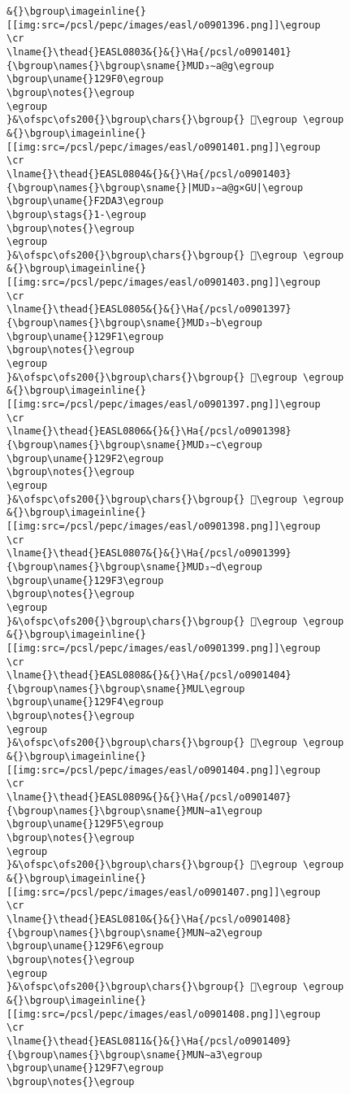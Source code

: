 \begin{verbatim}
&{}\bgroup\imageinline{}[[img:src=/pcsl/pepc/images/easl/o0901396.png]]\egroup
\cr
\lname{}\thead{}EASL0803&{}&{}\Ha{/pcsl/o0901401}{\bgroup\names{}\bgroup\sname{}MUD₃∼a@g\egroup
\bgroup\uname{}129F0\egroup
\bgroup\notes{}\egroup
\egroup
}&\ofspc\ofs200{}\bgroup\chars{}\bgroup{} 𒧰\egroup \egroup
&{}\bgroup\imageinline{}[[img:src=/pcsl/pepc/images/easl/o0901401.png]]\egroup
\cr
\lname{}\thead{}EASL0804&{}&{}\Ha{/pcsl/o0901403}{\bgroup\names{}\bgroup\sname{}|MUD₃∼a@g×GU|\egroup
\bgroup\uname{}F2DA3\egroup
\bgroup\stags{}1-\egroup
\bgroup\notes{}\egroup
\egroup
}&\ofspc\ofs200{}\bgroup\chars{}\bgroup{} 󲶣\egroup \egroup
&{}\bgroup\imageinline{}[[img:src=/pcsl/pepc/images/easl/o0901403.png]]\egroup
\cr
\lname{}\thead{}EASL0805&{}&{}\Ha{/pcsl/o0901397}{\bgroup\names{}\bgroup\sname{}MUD₃∼b\egroup
\bgroup\uname{}129F1\egroup
\bgroup\notes{}\egroup
\egroup
}&\ofspc\ofs200{}\bgroup\chars{}\bgroup{} 𒧱\egroup \egroup
&{}\bgroup\imageinline{}[[img:src=/pcsl/pepc/images/easl/o0901397.png]]\egroup
\cr
\lname{}\thead{}EASL0806&{}&{}\Ha{/pcsl/o0901398}{\bgroup\names{}\bgroup\sname{}MUD₃∼c\egroup
\bgroup\uname{}129F2\egroup
\bgroup\notes{}\egroup
\egroup
}&\ofspc\ofs200{}\bgroup\chars{}\bgroup{} 𒧲\egroup \egroup
&{}\bgroup\imageinline{}[[img:src=/pcsl/pepc/images/easl/o0901398.png]]\egroup
\cr
\lname{}\thead{}EASL0807&{}&{}\Ha{/pcsl/o0901399}{\bgroup\names{}\bgroup\sname{}MUD₃∼d\egroup
\bgroup\uname{}129F3\egroup
\bgroup\notes{}\egroup
\egroup
}&\ofspc\ofs200{}\bgroup\chars{}\bgroup{} 𒧳\egroup \egroup
&{}\bgroup\imageinline{}[[img:src=/pcsl/pepc/images/easl/o0901399.png]]\egroup
\cr
\lname{}\thead{}EASL0808&{}&{}\Ha{/pcsl/o0901404}{\bgroup\names{}\bgroup\sname{}MUL\egroup
\bgroup\uname{}129F4\egroup
\bgroup\notes{}\egroup
\egroup
}&\ofspc\ofs200{}\bgroup\chars{}\bgroup{} 𒧴\egroup \egroup
&{}\bgroup\imageinline{}[[img:src=/pcsl/pepc/images/easl/o0901404.png]]\egroup
\cr
\lname{}\thead{}EASL0809&{}&{}\Ha{/pcsl/o0901407}{\bgroup\names{}\bgroup\sname{}MUN∼a1\egroup
\bgroup\uname{}129F5\egroup
\bgroup\notes{}\egroup
\egroup
}&\ofspc\ofs200{}\bgroup\chars{}\bgroup{} 𒧵\egroup \egroup
&{}\bgroup\imageinline{}[[img:src=/pcsl/pepc/images/easl/o0901407.png]]\egroup
\cr
\lname{}\thead{}EASL0810&{}&{}\Ha{/pcsl/o0901408}{\bgroup\names{}\bgroup\sname{}MUN∼a2\egroup
\bgroup\uname{}129F6\egroup
\bgroup\notes{}\egroup
\egroup
}&\ofspc\ofs200{}\bgroup\chars{}\bgroup{} 𒧶\egroup \egroup
&{}\bgroup\imageinline{}[[img:src=/pcsl/pepc/images/easl/o0901408.png]]\egroup
\cr
\lname{}\thead{}EASL0811&{}&{}\Ha{/pcsl/o0901409}{\bgroup\names{}\bgroup\sname{}MUN∼a3\egroup
\bgroup\uname{}129F7\egroup
\bgroup\notes{}\egroup

\end{verbatim}
